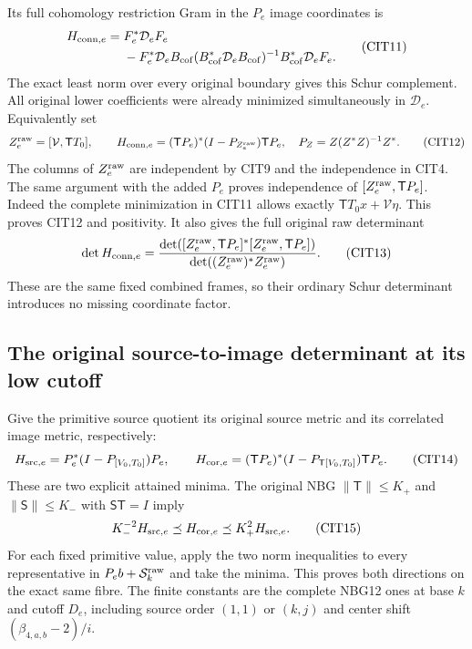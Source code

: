 \documentclass[10pt]{article}
\begin{document}
Its full cohomology restriction Gram in the $P_e$ image coordinates is
\[
 \begin{split}
 H_{{\rm conn},e}
 ={}&F_e^*\mathcal D_eF_e\\
 &-F_e^*\mathcal D_e B_{\rm cof}
       (B_{\rm cof}^*\mathcal D_eB_{\rm cof})^{-1}
                           B_{\rm cof}^*\mathcal D_eF_e .
 \end{split}\tag{CIT11}
\]
The exact least norm over every original boundary gives this
Schur complement. All original lower coefficients were already
minimized simultaneously in $\mathcal D_e$. Equivalently set
\[
 Z_e^{\rm raw}=[\mathcal V,\mathsf T T_0],\qquad
 H_{{\rm conn},e}
  =(\mathsf T P_e)^*(I-P_{Z_e^{\rm raw}})\mathsf T P_e,
 \quad P_Z=Z(Z^*Z)^{-1}Z^* .
 \tag{CIT12}
\]
The columns of $Z_e^{\rm raw}$ are independent by CIT9 and
the independence in CIT4. The same argument with the added
$P_e$ proves independence of $[Z_e^{\rm raw},\mathsf T P_e]$.
Indeed the complete minimization in CIT11 allows exactly
$\mathsf T T_0x+\mathcal V\eta$. This proves CIT12 and positivity.
It also gives the full original raw determinant
\[
 \det H_{{\rm conn},e}
 =\frac{\det([Z_e^{\rm raw},\mathsf T P_e]^*
                         [Z_e^{\rm raw},\mathsf T P_e])}
        {\det((Z_e^{\rm raw})^*Z_e^{\rm raw})}.
 \tag{CIT13}
\]
These are the same fixed combined frames, so their ordinary
Schur determinant introduces no missing coordinate factor.

\subsection{The original source-to-image determinant at its low cutoff}

Give the primitive source quotient its original source metric
and its correlated image metric, respectively:
\[
 H_{{\rm src},e}=P_e^*(I-P_{[V_0,T_0]})P_e,\qquad
 H_{{\rm cor},e}=(\mathsf T P_e)^*
                  (I-P_{\mathsf T[V_0,T_0]})\mathsf T P_e .
 \tag{CIT14}
\]
These are two explicit attained minima. The original NBG
$\|\mathsf T\|\le K_+$ and $\|\mathsf S\|\le K_-$ with
$\mathsf S\mathsf T=I$ imply
\[
 K_-^{-2}H_{{\rm src},e}\preceq H_{{\rm cor},e}
                  \preceq K_+^2H_{{\rm src},e}.
 \tag{CIT15}
\]
For each fixed primitive value, apply the two norm inequalities
to every representative in $P_eb+\mathcal S_k^{\rm raw}$ and
take the minima. This proves both directions on the exact same
fibre. The finite constants are the complete NBG12 ones at
base $k$ and cutoff $D_e$, including source order $(1,1)$ or
$(k,j)$ and center shift $(\beta_{4,a,b}-2)/i$.
\end{document}
